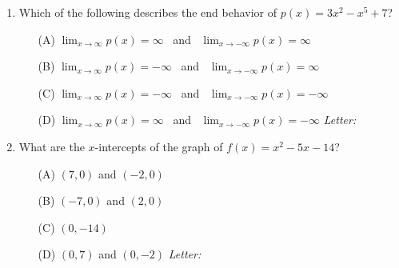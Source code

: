 \documentclass[10pt]{article}
\begin{document}
\begin{enumerate}[leftmargin=1.9em, itemsep=11pt]
\item Which of the following describes the end behavior of $p(x) = 3x^2 - x^5 + 7$?
      \begin{enumerate}[leftmargin=2.6em, itemsep=2pt]
        \item[(A)] $\lim_{x \to \infty} p(x) = \infty$ \ and \ $\lim_{x \to -\infty} p(x) = \infty$
        \item[(B)] $\lim_{x \to \infty} p(x) = -\infty$ \ and \ $\lim_{x \to -\infty} p(x) = \infty$
        \item[(C)] $\lim_{x \to \infty} p(x) = -\infty$ \ and \ $\lim_{x \to -\infty} p(x) = -\infty$
        \item[(D)] $\lim_{x \to \infty} p(x) = \infty$ \ and \ $\lim_{x \to -\infty} p(x) = -\infty$ \hfill\textit{Letter:}~\gradedblank[id=ap3, type=choice, points=1, answer=B]{0.42in}{13pt}
      \end{enumerate}

\item What are the $x$-intercepts of the graph of $f(x) = x^2 - 5x - 14$?
      \begin{enumerate}[leftmargin=2.6em, itemsep=2pt]
        \item[(A)] $(7, 0)$ and $(-2, 0)$
        \item[(B)] $(-7, 0)$ and $(2, 0)$
        \item[(C)] $(0, -14)$
        \item[(D)] $(0, 7)$ and $(0, -2)$ \hfill\textit{Letter:}~\gradedblank[id=ap4, type=choice, points=1, answer=A]{0.42in}{13pt}
      \end{enumerate}


\end{enumerate}
\end{document}
